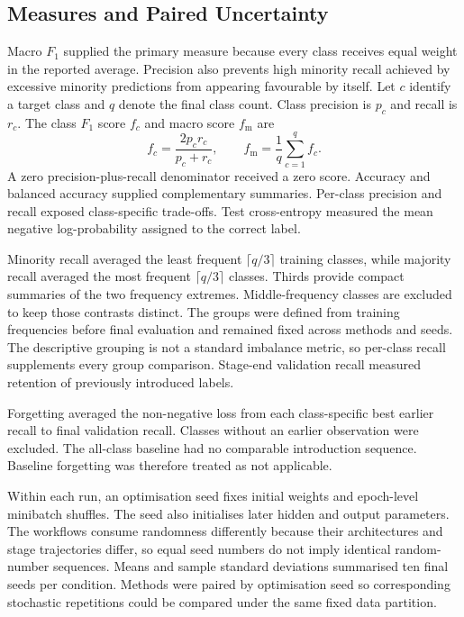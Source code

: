 \documentclass[conference,10pt]{IEEEtran}
\begin{document}
\subsection{Measures and Paired Uncertainty}

Macro $F_1$ supplied the primary measure because every class receives equal weight in the reported average. Precision also prevents high minority recall achieved by excessive minority predictions from appearing favourable by itself. Let $c$ identify a target class and $q$ denote the final class count. Class precision is $p_c$ and recall is $r_c$. The class $F_1$ score $f_c$ and macro score $f_{\mathrm{m}}$ are
\begin{equation}
f_c=\frac{2p_c r_c}{p_c+r_c},\qquad
f_{\mathrm{m}}=\frac{1}{q}\sum_{c=1}^{q}f_c.
\label{eq:metrics}
\end{equation}
A zero precision-plus-recall denominator received a zero score. Accuracy and balanced accuracy supplied complementary summaries. Per-class precision and recall exposed class-specific trade-offs. Test cross-entropy measured the mean negative log-probability assigned to the correct label.

Minority recall averaged the least frequent $\lceil q/3\rceil$ training classes, while majority recall averaged the most frequent $\lceil q/3\rceil$ classes. Thirds provide compact summaries of the two frequency extremes. Middle-frequency classes are excluded to keep those contrasts distinct. The groups were defined from training frequencies before final evaluation and remained fixed across methods and seeds. The descriptive grouping is not a standard imbalance metric, so per-class recall supplements every group comparison. Stage-end validation recall measured retention of previously introduced labels.

Forgetting averaged the non-negative loss from each class-specific best earlier recall to final validation recall. Classes without an earlier observation were excluded. The all-class baseline had no comparable introduction sequence. Baseline forgetting was therefore treated as not applicable.

Within each run, an optimisation seed fixes initial weights and epoch-level minibatch shuffles. The seed also initialises later hidden and output parameters. The workflows consume randomness differently because their architectures and stage trajectories differ, so equal seed numbers do not imply identical random-number sequences. Means and sample standard deviations summarised ten final seeds per condition. Methods were paired by optimisation seed so corresponding stochastic repetitions could be compared under the same fixed data partition.
\end{document}
